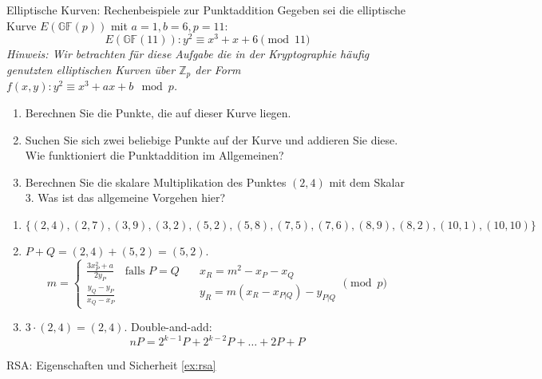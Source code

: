 \documentclass{article}
\begin{document}
\begin{exercise}{Elliptische Kurven: Rechenbeispiele zur Punktaddition}
  Gegeben sei die elliptische Kurve $E(\mathbb{GF}(p))$ mit $a = 1, b = 6, p = 11$:
    \[ E(\mathbb{GF}(11)) : y^2 \equiv x^3 + x + 6 \pmod{11} \]
  \textit{Hinweis: Wir betrachten für diese Aufgabe die in der Kryptographie häufig genutzten elliptischen Kurven über $ \mathbb{Z}_p $ der Form $f(x, y) : y^2 \equiv x^3 + ax + b \mod p$.}
  \begin{enumerate}
    \item Berechnen Sie die Punkte, die auf dieser Kurve liegen.
    \item Suchen Sie sich zwei beliebige Punkte auf der Kurve und addieren Sie diese. Wie funktioniert die Punktaddition im Allgemeinen?
    \item Berechnen Sie die skalare Multiplikation des Punktes $(2, 4)$ mit dem Skalar $ 3 $. Was ist das allgemeine Vorgehen hier?
  \end{enumerate}

  \begin{solution}
    \begin{enumerate}
        \item $\{(2,4), (2,7), (3,9), (3,2), (5,2), (5,8), (7,5), (7,6), (8,9), (8,2), (10,1), (10,10)\}$
        \item $P+Q=(2,4)+(5,2)=(5,2)$.
          \[
            m=\begin{cases}
              \frac{3x_P^2+a}{2y_P} \quad \text{falls } P=Q \\
              \frac{y_Q-y_P}{x_Q-x_P}
            \end{cases} \quad
            \begin{array}{l}
              x_R=m^2-x_P-x_Q\\
              y_R=m(x_R-x_{P|Q})-y_{P|Q}
            \end{array} \pmod{p} \]
        \item $3 \cdot (2,4)=(2,4)$. Double-and-add:
          \[ nP=2^{k-1}P+2^{k-2}P+\ldots+2P+P \]
    \end{enumerate}
  \end{solution}
\end{exercise}


\setcounter{subsection}{60}
\begin{exercise}{RSA: Eigenschaften und Sicherheit \ref{ex:rsa}}\end{exercise}
\end{document}
